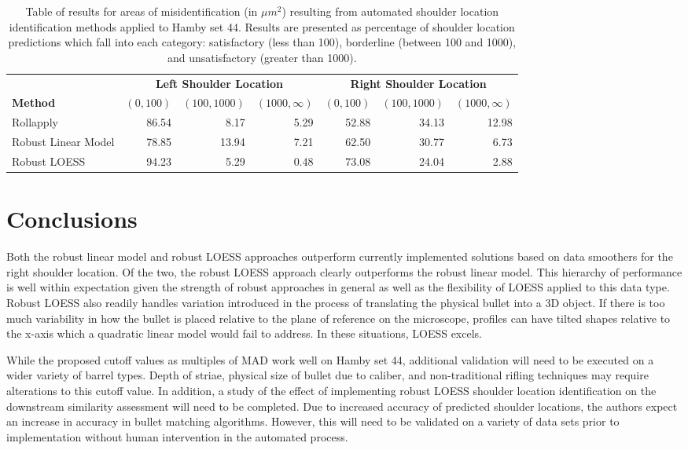 \documentclass[12pt]{article}
\begin{document}
\begin{table}[]
\centering
\begin{tabular}{lrrr|rrr}
& \multicolumn{3}{c}{\textbf{Left Shoulder Location}} & \multicolumn{3}{c}{\textbf{Right Shoulder Location}} \\
\textbf{Method} & $(0,100)$ & $ (100, 1000) $ & $(1000, \infty)$ & $(0,100)$ & $ (100, 1000) $ & $(1000, \infty)$ \\ \hline
Rollapply & 86.54 & 8.17 & 5.29 & 52.88& 34.13&12.98  \\ \hline
Robust Linear Model & 78.85 & 13.94 & 7.21 & 62.50 & 30.77&6.73 \\ \hline
Robust LOESS & 94.23 & 5.29 & 0.48 & 73.08& 24.04&2.88\\ \hline
\end{tabular}
\caption{Table of results for areas of misidentification (in $\mu m^2$) resulting from automated shoulder location identification methods applied to Hamby set 44. Results are presented as percentage of shoulder location predictions which fall into each category: satisfactory (less than 100), borderline (between 100 and 1000), and unsatisfactory (greater than 1000).}
\label{results-table}
\end{table}

\section{Conclusions}

Both the robust linear model and robust LOESS approaches outperform
currently implemented solutions based on data smoothers for the right
shoulder location. Of the two, the robust LOESS approach clearly
outperforms the robust linear model. This hierarchy of performance is
well within expectation given the strength of robust approaches in
general as well as the flexibility of LOESS applied to this data type.
Robust LOESS also readily handles variation introduced in the process of
translating the physical bullet into a 3D object. If there is too much
variability in how the bullet is placed relative to the plane of
reference on the microscope, profiles can have tilted shapes relative to
the x-axis which a quadratic linear model would fail to address. In
these situations, LOESS excels.

While the proposed cutoff values as multiples of MAD work well on Hamby
set 44, additional validation will need to be executed on a wider
variety of barrel types. Depth of striae, physical size of bullet due to
caliber, and non-traditional rifling techniques may require alterations
to this cutoff value. In addition, a study of the effect of implementing
robust LOESS shoulder location identification on the downstream
similarity assessment will need to be completed. Due to increased
accuracy of predicted shoulder locations, the authors expect an increase
in accuracy in bullet matching algorithms. However, this will need to be
validated on a variety of data sets prior to implementation without
human intervention in the automated process.



\end{document}
